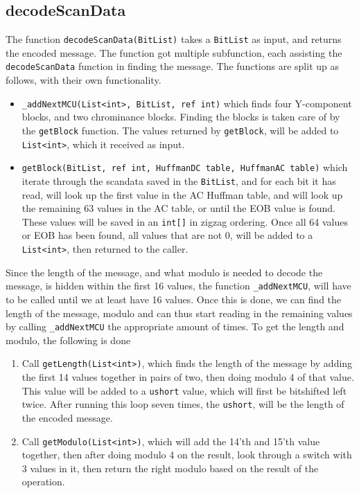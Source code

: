 \subsection{decodeScanData}
The function \lstinline|decodeScanData(BitList)| takes a \lstinline|BitList| as input, and returns the encoded message.
The function got multiple subfunction, each assisting the \lstinline|decodeScanData| function in finding the message. The functions are split up as follows, with their own functionality.
\begin{itemize}
	\item \lstinline|_addNextMCU(List<int>, BitList, ref int)| which finds four Y-component blocks, and two chrominance blocks. Finding the blocks is taken care of by the \lstinline|getBlock| function. The values returned by \lstinline|getBlock|, will be added to \lstinline|List<int>|, which it received as input.
	\item \lstinline|getBlock(BitList, ref int, HuffmanDC table, HuffmanAC table)| which iterate through the scandata saved in the \lstinline|BitList|, and for each bit it has read, will look up the first value in the AC Huffman table, and will look up the remaining 63 values in the AC table, or until the EOB value is found.
	These values will be saved in an \lstinline|int[]| in zigzag ordering.
	Once all 64 values or EOB has been found, all values that are not 0, will be added to a \lstinline|List<int>|, then returned to the caller.
\end{itemize}
Since the length of the message, and what modulo is needed to decode the message, is hidden within the first 16 values, the function \lstinline|_addNextMCU|, will have to be called until we at least have 16 values.
Once this is done, we can find the length of the message, modulo and can thus start reading in the remaining values by calling \lstinline|_addNextMCU| the appropriate amount of times.
To get the length and modulo, the following is done
\begin{enumerate}
	\item Call \lstinline|getLength(List<int>)|, which finds the length of the message by adding the first 14 values together in pairs of two, then doing modulo 4 of that value. 
	This value will be added to a \lstinline|ushort| value, which will first be bitshifted left twice. 
	After running this loop seven times, the \lstinline|ushort|, will be the length of the encoded message.
	\item Call \lstinline|getModulo(List<int>)|, which will add the 14'th and 15'th value together, then after doing modulo 4 on the result, look through a switch with 3 values in it, then return the right modulo based on the result of the operation.
\end{enumerate}
